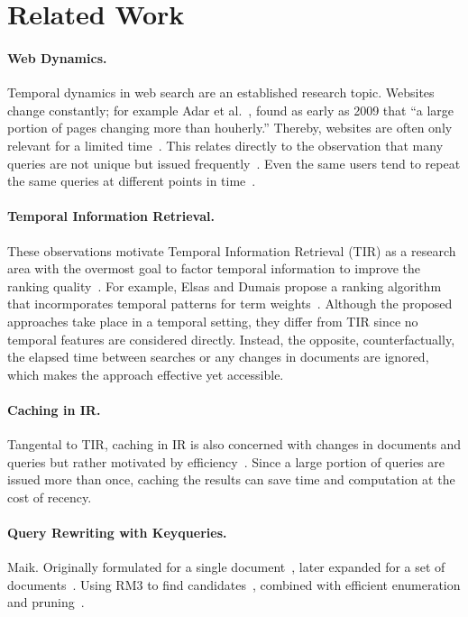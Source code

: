 \section{Related Work}
\label{sec:related-work}

\paragraph{Web Dynamics.}
Temporal dynamics in web search are an established research topic. Websites change constantly; for example Adar et al.~\cite{DBLP:conf/wsdm/AdarTDE09}, found as early as 2009 that ``a large portion of pages changing more than houherly.'' Thereby, websites are often only relevant for a limited time~\cite{DBLP:conf/sigir/TikhonovBBOKG13}. This relates directly to the observation that many queries are not unique but issued frequently~\cite{DBLP:conf/sigir/Dumais14,DBLP:journals/sigir/SilversteinHMM99}. Even the same users tend to repeat the same queries at different points in time~\cite{DBLP:conf/wsdm/TylerT10}.

\paragraph{Temporal Information Retrieval.}
These observations motivate Temporal Information Retrieval (TIR) as a research area with the overmost goal to factor temporal information to improve the ranking quality~\cite{DBLP:journals/ftir/KanhabuaBN15,DBLP:journals/csur/CamposDJJ14}. For example, Elsas and Dumais propose a ranking algorithm that incormporates temporal patterns for term weights~\cite{DBLP:conf/wsdm/ElsasD10}. Although the proposed approaches take place in a temporal setting, they differ from TIR since no temporal features are considered directly. Instead, the opposite, counterfactually, the elapsed time between searches or any changes in documents are ignored, which makes the approach effective yet accessible.

\paragraph{Caching in IR.}
Tangental to TIR, caching in IR is also concerned with changes in documents and queries but rather motivated by efficiency~\cite{DBLP:conf/www/CambazogluJPBCLB10,DBLP:conf/sigir/Baeza-YatesGJMPS07}. Since a large portion of queries are issued more than once, caching the results can save time and computation at the cost of recency.


\paragraph{Query Rewriting with Keyqueries.} {\color{red} Maik.} Originally formulated for a single document~\cite{gollub:2013a}, later expanded for a set of documents~\cite{hagen:2016b}. Using RM3 to find candidates~\cite{froebe:2022d}, combined with efficient enumeration and pruning~\cite{froebe:2021c}.

